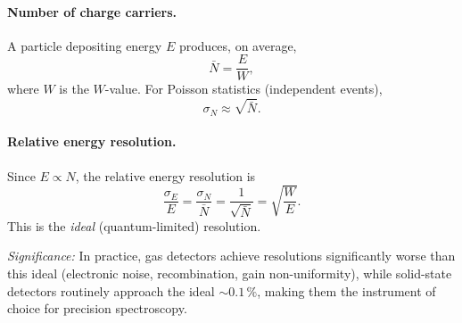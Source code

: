 \paragraph{Number of charge carriers.}
A particle depositing energy $E$ produces, on average,
\begin{equation}
  \label{eq:lec07:N_carriers}
  \boxed{\bar{N} = \frac{E}{W},}
\end{equation}
where $W$ is the $W$-value.  For Poisson statistics (independent events),
\begin{equation}
  \label{eq:lec07:sigma_N}
  \sigma_N \approx \sqrt{\bar{N}}.
\end{equation}

\paragraph{Relative energy resolution.}
Since $E \propto N$, the relative energy resolution is
\begin{equation}
  \label{eq:lec07:energy_res}
  \boxed{\frac{\sigma_E}{E} = \frac{\sigma_N}{\bar{N}} = \frac{1}{\sqrt{\bar{N}}} = \sqrt{\frac{W}{E}}.}
\end{equation}
This is the \emph{ideal} (quantum-limited) resolution.


\textit{Significance:} In practice, gas detectors achieve resolutions
significantly worse than this ideal (electronic noise, recombination, gain
non-uniformity), while solid-state detectors routinely approach the ideal
$\sim 0.1\,\%$, making them the instrument of choice for precision spectroscopy.

